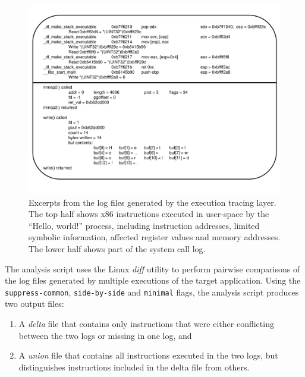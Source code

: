 \begin{figure}[h]
  \center
  \includegraphics[scale=0.60, trim=2cm 1.5cm 2cm 1.5cm]{log.pdf}
  \caption[Excerpts from the log files generated by the execution tracing layer]%
          {Excerpts from the log files generated by the execution tracing layer.
          The top half shows x86 instructions executed 
          in user-space by the ``Hello, world!'' process, including instruction addresses, 
          limited symbolic information, affected register values and memory 
          addresses. The lower half shows part of the system call log.}
  \label{hw:logsys}
\end{figure}

 \newline
The analysis script uses the Linux \emph{diff} utility
to perform pairwise comparisons of the log files generated 
by multiple executions of the target application. 
Using the \texttt{suppress-common}, \texttt{side-by-side}
and \texttt{minimal} flags, the analysis script
produces two output files: 
\begin{enumerate}
\item A {\em delta} file
that contains only instructions that were 
either conflicting between the two logs or missing in one log, and
\item A {\em union} file that contains all instructions
executed in the two logs, but distinguishes instructions  
included in the delta file from others.
\end{enumerate}

